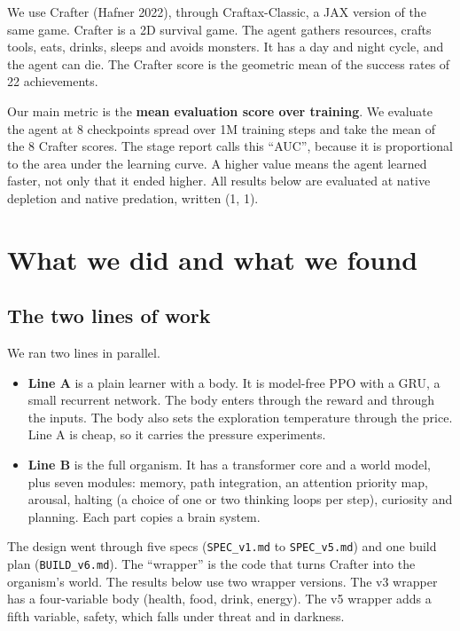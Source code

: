 \documentclass[11pt]{article}
\begin{document}
We use Crafter (Hafner 2022), through Craftax-Classic, a JAX version of the same game. Crafter is a 2D survival game. The agent gathers resources, crafts tools, eats, drinks, sleeps and avoids monsters. It has a day and night cycle, and the agent can die. The Crafter score is the geometric mean of the success rates of 22 achievements.

Our main metric is the \textbf{mean evaluation score over training}. We evaluate the agent at 8 checkpoints spread over 1M training steps and take the mean of the 8 Crafter scores. The stage report calls this ``AUC'', because it is proportional to the area under the learning curve. A higher value means the agent learned faster, not only that it ended higher. All results below are evaluated at native depletion and native predation, written (1, 1).

\section{What we did and what we found}

\subsection{The two lines of work}

We ran two lines in parallel.

\begin{itemize}
\item \textbf{Line A} is a plain learner with a body. It is model-free PPO with a GRU, a small recurrent network. The body enters through the reward and through the inputs. The body also sets the exploration temperature through the price. Line A is cheap, so it carries the pressure experiments.
\item \textbf{Line B} is the full organism. It has a transformer core and a world model, plus seven modules: memory, path integration, an attention priority map, arousal, halting (a choice of one or two thinking loops per step), curiosity and planning. Each part copies a brain system.
\end{itemize}

The design went through five specs (\texttt{SPEC\_v1.md} to \texttt{SPEC\_v5.md}) and one build plan (\texttt{BUILD\_v6.md}). The ``wrapper'' is the code that turns Crafter into the organism's world. The results below use two wrapper versions. The v3 wrapper has a four-variable body (health, food, drink, energy). The v5 wrapper adds a fifth variable, safety, which falls under threat and in darkness.
\end{document}
